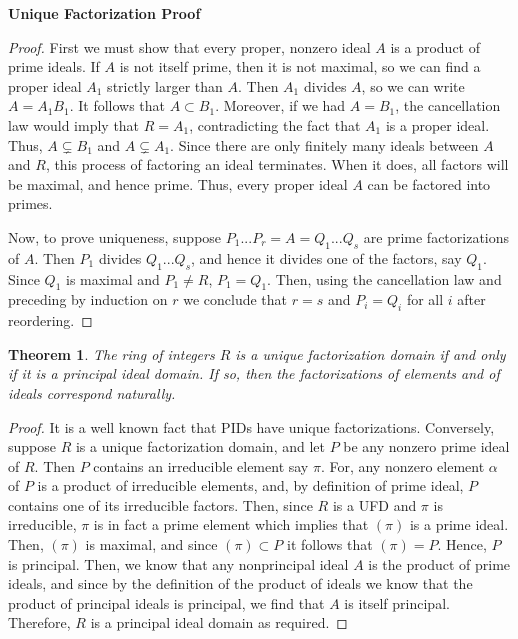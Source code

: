 \documentclass[12pt]{article}
\newtheorem{thm}{Theorem}[section]
\theoremstyle{definition}
\theoremstyle{remark}
\numberwithin{equation}{section}
\begin{document}
\vspace{15pt}

\textbf{Unique Factorization Proof}
\begin{proof}
        First we must show that every proper, nonzero ideal $A$ is a product of prime ideals. If $A$ is not itself prime, then it is not maximal, so we can find a proper ideal $A_1$ strictly larger than $A$. Then $A_1$ divides $A$, so we can write $A = A_1B_1$. It follows that $A \subset B_1$. Moreover, if we had $A = B_1$, the cancellation law would imply that $R= A_1$, contradicting the fact that $A_1$ is a proper ideal. Thus, $A \subsetneq B_1$ and $A \subsetneq A_1$. Since there are only finitely many ideals between $A$ and $R$, this process of factoring an ideal terminates. When it does, all factors will be maximal, and hence prime. Thus, every proper ideal $A$ can be factored into primes.


        Now, to prove uniqueness, suppose $P_1...P_r=A=Q_1...Q_s$ are prime factorizations of $A$. Then $P_1$ divides $Q_1...Q_s$, and hence it divides one of the factors, say $Q_1$. Since $Q_1$ is maximal and $P_1 \neq R$, $P_1 = Q_1$. Then, using the cancellation law and preceding by induction on $r$ we conclude that $r=s$ and $P_i = Q_i$ for all $i$ after reordering.
\end{proof}

\vspace{15pt}

\begin{thm}
        The ring of integers $R$ is a unique factorization domain if and only if it is a principal ideal domain. If so, then the factorizations of elements and of ideals correspond naturally.
\end{thm}
\begin{proof}
        It is a well known fact that PIDs have unique factorizations. Conversely, suppose $R$ is a unique factorization domain, and let $P$ be any nonzero prime ideal of $R$. Then $P$ contains an irreducible element say $\pi$. For, any nonzero element $\alpha$ of $P$ is a product of irreducible elements, and, by definition of prime ideal, $P$ contains one of its irreducible factors. Then, since $R$ is a UFD and $\pi$ is irreducible, $\pi$ is in fact a prime element which implies that $(\pi)$ is a prime ideal. Then, $(\pi)$ is maximal, and since $(\pi) \subset P$ it follows that $(\pi) = P$. Hence, $P$ is principal. Then, we know that any nonprincipal ideal $A$ is the product of prime ideals, and since by the definition of the product of ideals we know that the product of principal ideals is principal, we find that $A$ is itself principal. Therefore, $R$ is a principal ideal domain as required.
\end{proof}
\end{document}
